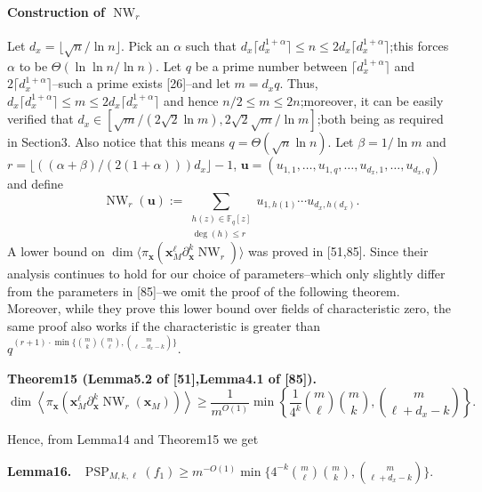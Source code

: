 \documentclass[10pt,a4paper]{article}
\newenvironment{authorclaim}[1]{\par\medskip\noindent\textbf{#1.}\ \ignorespaces}{\par\medskip}
\DeclareMathOperator{\PSP}{PSP}
\begin{document}
\paragraph{Construction of $\operatorname{NW}_r$}
Let $d_x=\lfloor\sqrt n/\ln n\rfloor$. Pick an $\alpha$ such that $d_x\lceil d_x^{1+\alpha}\rceil\le n\le2d_x\lceil d_x^{1+\alpha}\rceil$;this forces $\alpha$ to be $\Theta(\ln\ln n/\ln n)$. Let $q$ be a prime number between $\lceil d_x^{1+\alpha}\rceil$ and $2\lceil d_x^{1+\alpha}\rceil$--such a prime exists [26]--and let $m=d_xq$. Thus, $d_x\lceil d_x^{1+\alpha}\rceil\le m\le2d_x\lceil d_x^{1+\alpha}\rceil$ and hence $n/2\le m\le2n$;moreover, it can be easily verified that $d_x\in[\sqrt m/(2\sqrt2\ln m),2\sqrt2\sqrt m/\ln m]$;both being as required in Section3. Also notice that this means $q=\Theta(\sqrt n\ln n)$. Let $\beta=1/\ln m$ and $r=\lfloor((\alpha+\beta)/(2(1+\alpha)))d_x\rfloor-1$, $\mathbf u=(u_{1,1},\ldots,u_{1,q},\ldots,u_{d_x,1},\ldots,u_{d_x,q})$ and define
\[
\operatorname{NW}_r(\mathbf u):=\sum_{\substack{h(z)\in\mathbb F_q[z]\\\deg(h)\le r}}u_{1,h(1)}\cdots u_{d_x,h(d_x)}.
\]
A lower bound on $\dim\langle\pi_{\mathbf x}(\mathbf x_M^\ell\partial_{\mathbf x}^k\operatorname{NW}_r)\rangle$ was proved in [51,85]. Since their analysis continues to hold for our choice of parameters--which only slightly differ from the parameters in [85]--we omit the proof of the following theorem. Moreover, while they prove this lower bound over fields of characteristic zero, the same proof also works if the characteristic is greater than
$q^{(r+1)\cdot\min\{\binom mk\binom m\ell,\binom m{\ell-d_x-k}\}}$.
\begin{authorclaim}{Theorem15 (Lemma5.2 of [51],Lemma4.1 of [85])}
\[
\dim\left\langle\pi_{\mathbf x}(\mathbf x_M^\ell\partial_{\mathbf x}^k\operatorname{NW}_r(\mathbf x_M))\right\rangle
\ge\frac1{m^{O(1)}}\min\left\{\frac1{4^k}\binom m\ell\binom mk,\binom m{\ell+d_x-k}\right\}.
\]
\end{authorclaim}
Hence, from Lemma14 and Theorem15 we get
\begin{authorclaim}{Lemma16}
$\PSP_{M,k,\ell}(f_1)\ge m^{-O(1)}\min\{4^{-k}\binom m\ell\binom mk,\binom m{\ell+d_x-k}\}$.
\end{authorclaim}
\end{document}
